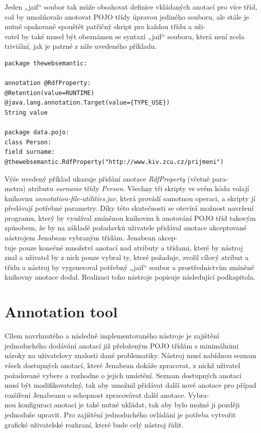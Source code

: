 \documentclass{projekt}
\begin{document}
Jeden „jaif“ soubor tak může obsahovat definice vkládaných anotací pro více tříd, což by umožňovalo anotovat POJO třídy úpravou jediného souboru, ale stále je nutné opakovaně spouštět patřičný skript pro každou třídu a uži-\\vatel by také musel být obeznámen se syntaxí „jaif“ souboru, která není zcela triviální, jak je patrné z níže uvedeného příkladu.

\begin{verbatim}
package thewebsemantic:

annotation @RdfProperty: 
@Retention(value=RUNTIME) 
@java.lang.annotation.Target(value={TYPE_USE})
String value

package data.pojo:
class Person:
field surname: 
@thewebsemantic.RdfProperty("http://www.kiv.zcu.cz/prijmeni")

\end{verbatim}

Výše uvedený příklad ukazuje přidání anotace {\it RdfProperty} (včetně para-\\metru) atributu {\it surname} třídy {\it Person}. 
Všechny tři skripty ve svém kódu volají knihovnu {\it annotation-file-utilities.jar}, která provádí samotnou operaci, a skripty jí předávají potřebné parametry. Díky této skutečnosti se otevírá možnost navržení programu, který by využíval zmíněnou knihovnu k anotování POJO tříd takovým způsobem, že by na základě požadavků uživatele přidával anotace akceptované nástrojem Jenabean vybraným třídám. Jenabean akcep-\\tuje pouze konečné množství anotací nad atributy a třídami, které by nástroj znal a uživatel by z nich pouze vybral ty, které požaduje, zvolil cílový atribut a třídu a nástroj by vygeneroval potřebný „jaif“ soubor a prostřednictvím zmíněné knihovny anotace dodal.
Realizaci toho nástroje popisuje následující podkapitola.

\section{Annotation tool}
\hspace{0.65cm}Cílem navrhnutého a následně implementovaného nástroje je zajištění jednoduchého dodávání anotací již přeloženým POJO třídám s minimálními nároky na uživatelovy znalosti dané problematiky. Nástroj musí nabídnou seznam všech dostupných anotací, které Jenabean dokáže zpracovat, z nichž uživatel požadované vybere a rozhodne o jejich umístění. Seznam dostupných anotací musí být modifikovatelný, tak aby umožnil přidávat další nové anotace pro případ rozšíření Jenabeanu o schopnost zpracovávat další anotace. Vybra-\\nou konfiguraci anotací je také nutné ukládat, tak aby bylo možné ji později jednoduše upravit. Pro zajištění jednoduchého ovládání je potřeba vytvořit grafické uživatelské rozhraní, které bude celý nástroj řídit.
\end{document}
